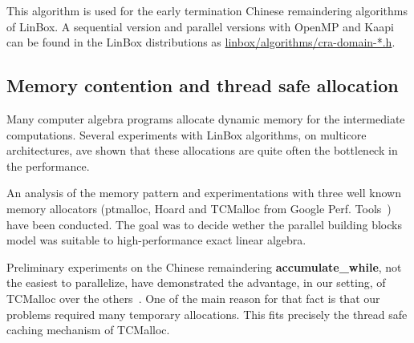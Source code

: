 \documentclass[runningheads,a4paper]{llncs}
\newcommand{\linboxsp}{{\sc LinBox}\xspace}
\newcommand{\linbox}{{\sc LinBox}}
\begin{document}
  This algorithm is used 
  for the early termination Chinese remaindering algorithms of
  \linbox. A sequential version and parallel versions with OpenMP and
  Kaapi can be found in the \linboxsp distributions as 
  \url{linbox/algorithms/cra-domain-*.h}.



\subsection{Memory contention and thread safe allocation}
Many computer algebra programs allocate dynamic memory for the
intermediate computations. Several experiments with \linboxsp
algorithms, on multicore architectures, ave shown that these
allocations are quite often the bottleneck in the performance.

An analysis of the memory pattern and experimentations with three well
known memory allocators 
(ptmalloc, Hoard and TCMalloc from Google Perf. Tools~\cite{tcmalloc})
have been conducted. The goal was to decide wether the parallel
building blocks model was suitable to high-performance exact linear
algebra.

Preliminary experiments on the Chinese remaindering {\bf accumulate\_while},
not the easiest to parallelize, have demonstrated the advantage, in
our setting, of TCMalloc over the others~\cite{jgd:2010:crt}.
One of the main reason for that fact is that our problems required
many temporary allocations. This fits precisely the thread safe caching
mechanism of TCMalloc.
\end{document}
